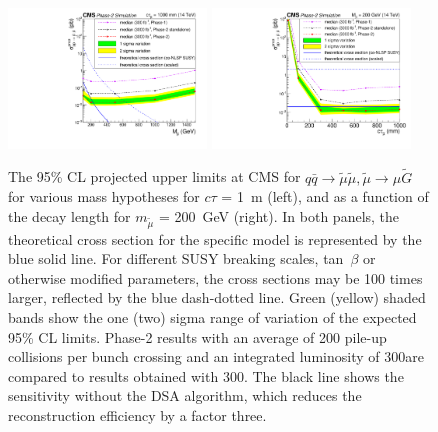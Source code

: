 \begin{figure}[t]\begin{center}
\includegraphics[width=0.47\textwidth]{figures/LimitComparison_withStandAloneEff.pdf}
\includegraphics[width=0.47\textwidth]{figures/LimitComparison_asfuncofCtau.pdf}
\caption{The 95\% CL projected upper limits at CMS for $q \bar q \to \widetilde{\mu} \widetilde{\mu}, \widetilde{\mu}\rightarrow \mu\widetilde{G}$ for various mass hypotheses for $c\tau$ = 1~m (left), and as a function of the decay length for $m_{\widetilde{\mu}}$ = 200~GeV (right). In both panels, the theoretical cross section for the specific model is represented by the blue solid line. For different SUSY breaking scales, tan~$\beta$ or otherwise modified parameters, the cross sections may be 100 times larger, reflected by the blue dash-dotted line. Green (yellow) shaded bands show the one (two) sigma range of variation of the expected 95\% CL limits. Phase-2 results with an average of 200 pile-up collisions per bunch crossing and an integrated luminosity of $300$\fbinv are compared to results obtained with $300$\fbinv. The black line shows the sensitivity without the DSA algorithm, which reduces the reconstruction efficiency by a factor three.
 }
\label{fig:displResults}
\end{center}
\end{figure}

